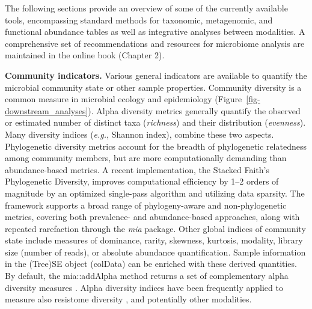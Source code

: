 \documentclass[
  sn-nature,
]{sn-jnl}
\begin{document}
The following sections provide an overview of some of the currently
available tools, encompassing standard methods for taxonomic,
metagenomic, and functional abundance tables as well as integrative
analyses between modalities. A comprehensive set of recommendations and
resources for microbiome analysis are maintained in the online book
(Chapter 2).

\textbf{Community indicators.} Various general indicators are available
to quantify the microbial community state or other sample properties.
Community diversity is a common measure in microbial ecology and
epidemiology \citep{bastiaanssen2023_1}
(Figure~\ref{fig-downstream_analyses}). Alpha diversity metrics
generally quantify the observed or estimated number of distinct taxa
(\emph{richness}) and their distribution (\emph{evenness}). Many
diversity indices (\emph{e.g.}, Shannon index), combine these two
aspects. Phylogenetic diversity metrics account for the breadth of
phylogenetic relatedness among community members, but are more
computationally demanding than abundance-based metrics. A recent
implementation, the Stacked Faith's Phylogenetic Diversity, improves
computational efficiency by 1--2 orders of magnitude
\citep{armstrong2021} by an optimized single-pass algorithm and
utilizing data sparsity. The framework supports a broad range of
phylogeny-aware and non-phylogenetic metrics, covering both prevalence-
and abundance-based approaches, along with repeated rarefaction
\citep{schloss2024b} through the \emph{mia} package. Other global
indices of community state include measures of dominance, rarity,
skewness, kurtosis, modality, library size (number of reads), or
absolute abundance quantification. Sample information in the (Tree)SE
object (colData) can be enriched with these derived quantities. By
default, the mia::addAlpha method returns a set of complementary alpha
diversity measures \citep{cassol2025}. Alpha diversity indices have been
frequently applied to measure also resistome diversity
\citep{lee2023, salehi2025}, and potentially other modalities.
\end{document}
